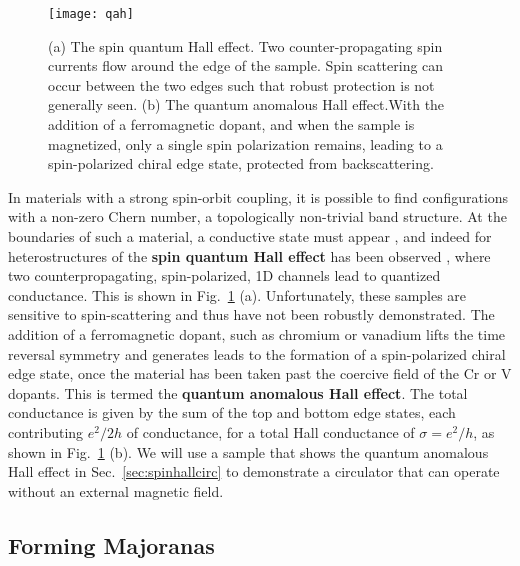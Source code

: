 \begin{figure}
  \texttt{[image: qah]}
  \caption[Quantum spin Hall and quantum anomalous Hall effect]
  {\label{fig:qah}(a) The spin quantum Hall effect. Two counter-propagating spin currents flow around the edge of the sample. Spin scattering can occur between the two
  edges such that robust protection is not generally seen. (b) The quantum anomalous Hall effect.With the addition of a ferromagnetic dopant, and when the sample is magnetized,
  only a single spin polarization remains, leading to a spin-polarized chiral edge state, protected from backscattering.}
\end{figure}

In materials with a strong spin-orbit coupling, it is possible to find configurations with a non-zero Chern number, a topologically non-trivial band structure.
At the boundaries of such a material, a conductive state must appear \cite{PhysRevLett.93.156804,PhysRevLett.92.126603}, and indeed for heterostructures of 
the \textbf{spin quantum Hall effect} has been observed \cite{Konig766}, where two counterpropagating, spin-polarized, 1D channels lead to quantized conductance. This is
shown in Fig.~\ref{fig:qah} (a). Unfortunately, these
samples are sensitive to spin-scattering and thus have not been robustly demonstrated. The addition of a ferromagnetic dopant, such as chromium or vanadium lifts the
time reversal symmetry and generates leads to the formation of a spin-polarized chiral edge state, once the material has been taken past the coercive field of the
Cr or V dopants. This is termed the \textbf{quantum anomalous Hall effect}. The total conductance is given by the sum of the top and bottom edge states,
each contributing $e^2/2h$ of conductance, for a total Hall conductance of $\sigma = e^2/h$, as shown in Fig.~\ref{fig:qah} (b). We will use a sample that shows the
quantum anomalous Hall effect in Sec.~\ref{sec:spinhallcirc} to demonstrate a circulator that can operate without an external magnetic field.

\subsection{Forming Majoranas}
\label{sec:makemajo}

